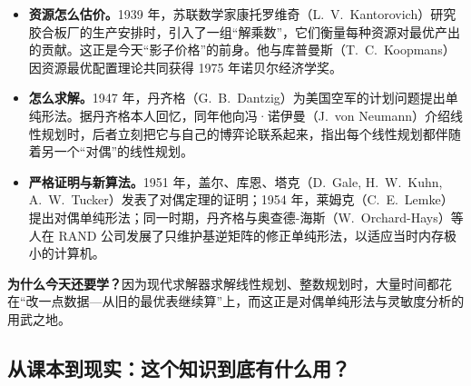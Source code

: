 \begin{historybox}[人们遇到了什么问题？]
\begin{itemize}
  \item \textbf{资源怎么估价。}1939 年，苏联数学家康托罗维奇（L.~V.~Kantorovich）研究胶合板厂的生产安排时，引入了一组“解乘数”，它们衡量每种资源对最优产出的贡献。这正是今天“影子价格”的前身。他与库普曼斯（T.~C.~Koopmans）因资源最优配置理论共同获得 1975 年诺贝尔经济学奖。
  \item \textbf{怎么求解。}1947 年，丹齐格（G.~B.~Dantzig）为美国空军的计划问题提出单纯形法。据丹齐格本人回忆，同年他向冯·诺伊曼（J.~von Neumann）介绍线性规划时，后者立刻把它与自己的博弈论联系起来，指出每个线性规划都伴随着另一个“对偶”的线性规划。
  \item \textbf{严格证明与新算法。}1951 年，盖尔、库恩、塔克（D.~Gale, H.~W.~Kuhn, A.~W.~Tucker）发表了对偶定理的证明；1954 年，莱姆克（C.~E.~Lemke）提出对偶单纯形法；同一时期，丹齐格与奥查德-海斯（W.~Orchard-Hays）等人在 RAND 公司发展了只维护基逆矩阵的修正单纯形法，以适应当时内存极小的计算机。
\end{itemize}
\textbf{为什么今天还要学？}因为现代求解器求解线性规划、整数规划时，大量时间都花在“改一点数据—从旧的最优表继续算”上，而这正是对偶单纯形法与灵敏度分析的用武之地。
\end{historybox}


\subsection*{从课本到现实：这个知识到底有什么用？}

